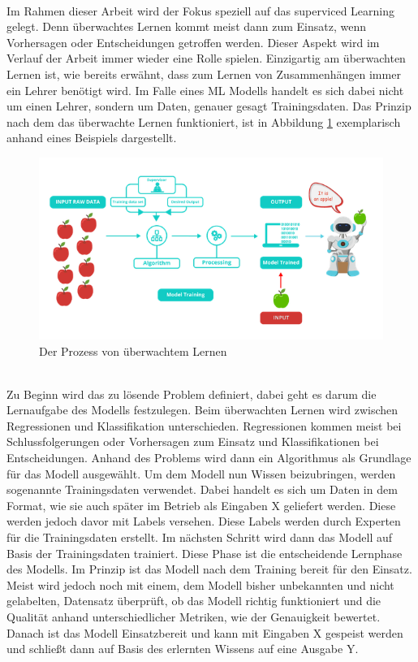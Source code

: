 \begin{onehalfspace}
        \\
        Im Rahmen dieser Arbeit wird der Fokus speziell auf das superviced Learning gelegt. Denn überwachtes Lernen kommt meist dann zum Einsatz, wenn Vorhersagen oder Entscheidungen getroffen werden. Dieser Aspekt wird im Verlauf der Arbeit immer wieder eine Rolle spielen. Einzigartig am überwachten Lernen ist, wie bereits erwähnt, dass zum Lernen von Zusammenhängen immer ein \glqq{}Lehrer\grqq{} benötigt wird. Im Falle eines \ac{ML} Modells handelt es sich dabei nicht um einen Lehrer, sondern um Daten, genauer gesagt Trainingsdaten.
        Das Prinzip nach dem das überwachte Lernen funktioniert, ist in Abbildung \ref*{fig:learningProcess} exemplarisch anhand eines Beispiels dargestellt.
        \begin{figure}[h]
            \centering
            \includegraphics[width = 14cm]{Bilder/superviced_learning.png}
            \caption{Der Prozess von überwachtem Lernen \cite{Kharwal2020}}
            \label{fig:learningProcess}
        \end{figure}
        \\
        Zu Beginn wird das zu lösende Problem definiert, dabei geht es darum die Lernaufgabe des Modells festzulegen. Beim überwachten Lernen wird zwischen Regressionen und Klassifikation unterschieden. Regressionen kommen meist bei Schlussfolgerungen oder Vorhersagen zum Einsatz und Klassifikationen bei Entscheidungen. 
        Anhand des Problems wird dann ein Algorithmus als Grundlage für das Modell ausgewählt. Um dem Modell nun Wissen beizubringen, werden sogenannte Trainingsdaten verwendet. Dabei handelt es sich um Daten in dem Format, wie sie auch später im Betrieb als Eingaben X geliefert werden. Diese werden jedoch davor mit Labels versehen. Diese Labels werden durch Experten für die Trainingsdaten erstellt. Im nächsten Schritt wird dann das Modell auf Basis der Trainingsdaten trainiert. Diese Phase ist die entscheidende Lernphase des Modells. Im Prinzip ist das Modell nach dem Training bereit für den Einsatz. Meist wird jedoch noch mit einem, dem Modell bisher unbekannten und nicht gelabelten, Datensatz überprüft, ob das Modell richtig funktioniert und die Qualität anhand unterschiedlicher Metriken, wie der Genauigkeit bewertet. Danach ist das Modell Einsatzbereit und kann mit Eingaben X gespeist werden und schließt dann auf Basis des erlernten Wissens auf eine Ausgabe Y.\cite{Horn2022}\cite{Döbel2018}

\end{onehalfspace}
